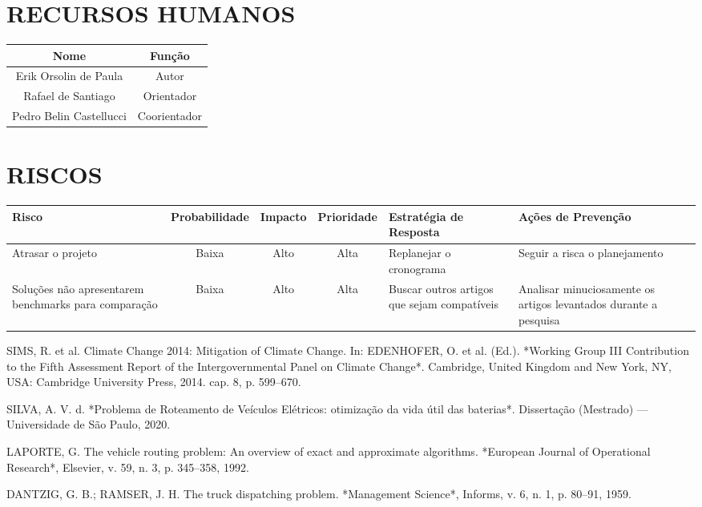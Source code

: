 \documentclass{ufscThesis}
\begin{document}
\chapter{RECURSOS HUMANOS}
\begin{center}
	\begin{table}[ht]
	\centering
		\begin{tabular}{|c|c|}
		\hline
		\textbf{Nome} & \textbf{Função}\\\hline
		Erik Orsolin de Paula & Autor\\\hline
		Rafael de Santiago & Orientador\\\hline
		Pedro Belin Castellucci & Coorientador\\\hline
		\end{tabular}
	\end{table}
\end{center}

\chapter{RISCOS}
	\begin{table}[H]
		\begin{tabular}{|p{2cm}|c|c|c|p{2cm}|p{5cm}|}
			\hline
			\textbf{Risco} & \textbf{Probabilidade} & \textbf{Impacto} & \textbf{Prioridade} & \textbf{Estratégia de Resposta} & \textbf{Ações de Prevenção}\\\hline
			Atrasar o projeto & Baixa & Alto & Alta & Replanejar o cronograma & Seguir a risca o planejamento\\
			\hline
		    Soluções não apresentarem  benchmarks para comparação & Baixa & Alto & Alta & Buscar outros artigos que sejam compatíveis  & Analisar minuciosamente  os artigos levantados durante a pesquisa\\\hline
			
		\end{tabular}
	\end{table}

\begin{thebibliography}{99}

SIMS, R. et al. Climate Change 2014: Mitigation of Climate Change. In: EDENHOFER, O. et al. (Ed.). *Working Group III Contribution to the Fifth Assessment Report of the Intergovernmental Panel on Climate Change*. Cambridge, United Kingdom and New York, NY, USA: Cambridge University Press, 2014. cap. 8, p. 599–670.

SILVA, A. V. d. *Problema de Roteamento de Veículos Elétricos: otimização da vida útil das baterias*. Dissertação (Mestrado) — Universidade de São Paulo, 2020.

LAPORTE, G. The vehicle routing problem: An overview of exact and approximate algorithms. *European Journal of Operational Research*, Elsevier, v. 59, n. 3, p. 345–358, 1992.

DANTZIG, G. B.; RAMSER, J. H. The truck dispatching problem. *Management Science*, Informs, v. 6, n. 1, p. 80–91, 1959.

\end{thebibliography}
\end{document}
